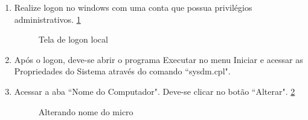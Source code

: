 \begin{enumerate}
	\item {Realize logon no windows com uma conta que possua privilégios administrativos. \ref{logon_local_adm}}
	\begin{figure}[ht]
   			\centering
   			\caption{Tela de logon local}
    		\label{logon_local_adm}
	\end{figure}

	\item {Após o logon, deve-se abrir o programa Executar no menu Iniciar e acessar as Propriedades do Sistema através do comando ``sysdm.cpl".}

	\item {Acessar a aba ``Nome do Computador". Deve-se clicar no botão ``Alterar". \ref{alterar_nome_micro}}

		\begin{figure}[ht]
	   			\centering
	   			\caption{Alterando nome do micro}
	    		\label{alterar_nome_micro}
		\end{figure}
		 
		\pagebreak 


\end{enumerate}
